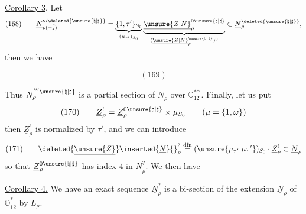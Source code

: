 \uline{Corollary 3}. Let
\[
(168)\qquad
\underline N_{\rho(-\bar j)}^{\prime\prime\prime\deleted{\unsure{\natural|\sharp}}}
=\underbrace{\{1,\tau'\}_{S_0}}_{(\mu_{\tau'})_{S_0}}
\underbrace{\underline{\unsure{Z|N}}_\rho^{0\unsure{\natural|\sharp}}}_{(\underline{\unsure{Z|N}}_\rho^{\unsure{\natural|\sharp}})^0}
\subset\underline N_\rho^{\deleted{\unsure{\natural|\sharp}}},
\]
then we have
\begin{samepage}
\[
(169)
\]
\end{samepage}


Thus \(N_\rho^{'''\unsure{\natural|\sharp}}\) is a partial section of \(N_\rho\)
over \(\mathbb O_{12}^{*'''}\). Finally, let us put
\[
(170)\qquad
\underline Z_\rho^{!}
=\underline Z_\rho^{0\unsure{\natural|\sharp}}\times\mu_{S_0}
\qquad(\mu=\{1,\omega\})
\]
then \(\underline Z_\rho^!\) is normalized by \(\tau'\), and
we can introduce
\[
(171)\qquad
\deleted{\underline{\unsure{Z}}}\inserted{\underline N}{}_\rho^{?}
\mathrel{\overset{\mathrm{dfn}}{=}}
(\unsure{\mu_{\tau'}|\mu\tau'})_{S_0}\cdot\underline Z_\rho^!
\subset\underline N_\rho
\]
so that \(\underline Z_\rho^{0\unsure{\natural|\sharp}}\) has index \(4\)
in \(\underline N_\rho^{?}\). We then have

\uline{Corollary 4.} We have an exact sequence
\(\underline N_\rho^{?}\) is a bi-section of the extension
\(\underline N_\rho\) of \(\underline{\mathbb O}_{12}^{*}\) by \(L_\rho\).

